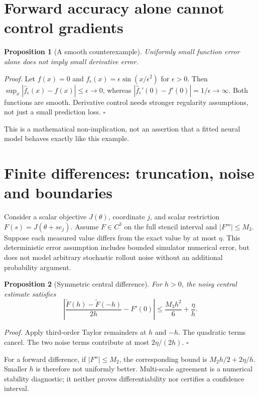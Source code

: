 \documentclass[10pt]{article}
\newtheorem{proposition}{Proposition}
\newenvironment{proof}{\par\noindent\textit{Proof.} }{\hfill$\square$\par}
\begin{document}
\section{Forward accuracy alone cannot control gradients}
\begin{proposition}[A smooth counterexample]
Uniformly small function error alone does not imply small derivative error.
\end{proposition}
\begin{proof}
Let $f(x)=0$ and $\hat f_\epsilon(x)=\epsilon\sin(x/\epsilon^2)$ for $\epsilon>0$. Then
$\sup_x|\hat f_\epsilon(x)-f(x)|\le\epsilon\to0$, whereas
$|\hat f_\epsilon'(0)-f'(0)|=1/\epsilon\to\infty$.
Both functions are smooth. Derivative control needs stronger regularity assumptions, not just a small prediction loss.
\end{proof}
This is a mathematical non-implication, not an assertion that a fitted neural model behaves exactly like this example.

\section{Finite differences: truncation, noise and boundaries}
Consider a scalar objective $J(\theta)$, coordinate $j$, and scalar restriction $F(s)=J(\theta+s e_j)$. Assume $F\in C^3$ on the full stencil interval and $|F'''|\le M_3$. Suppose each measured value differs from the exact value by at most $\eta$. This deterministic error assumption includes bounded simulator numerical error, but does not model arbitrary stochastic rollout noise without an additional probability argument.

\begin{proposition}[Symmetric central difference]
For $h>0$, the noisy central estimate satisfies
\begin{equation}
\left|\frac{\widetilde F(h)-\widetilde F(-h)}{2h}-F'(0)\right|
\le \frac{M_3h^2}{6}+\frac{\eta}{h}.
\end{equation}
\end{proposition}
\begin{proof}
Apply third-order Taylor remainders at $h$ and $-h$. The quadratic terms cancel. The two noise terms contribute at most $2\eta/(2h)$.
\end{proof}
For a forward difference, if $|F''|\le M_2$, the corresponding bound is $M_2h/2+2\eta/h$. Smaller $h$ is therefore not uniformly better. Multi-scale agreement is a numerical stability diagnostic; it neither proves differentiability nor certifies a confidence interval.
\end{document}
